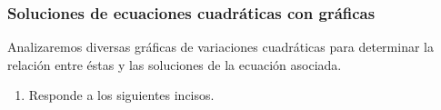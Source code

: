 \documentclass[11pt]{book}
\begin{document}
\newpage

\subsubsection{Soluciones de ecuaciones cuadráticas con gráficas}

Analizaremos diversas gráficas de variaciones cuadráticas para determinar
la relación entre éstas y las soluciones de la ecuación asociada.

\begin{enumerate}
  \item Responde a los siguientes incisos.
\end{enumerate}
\end{document}
